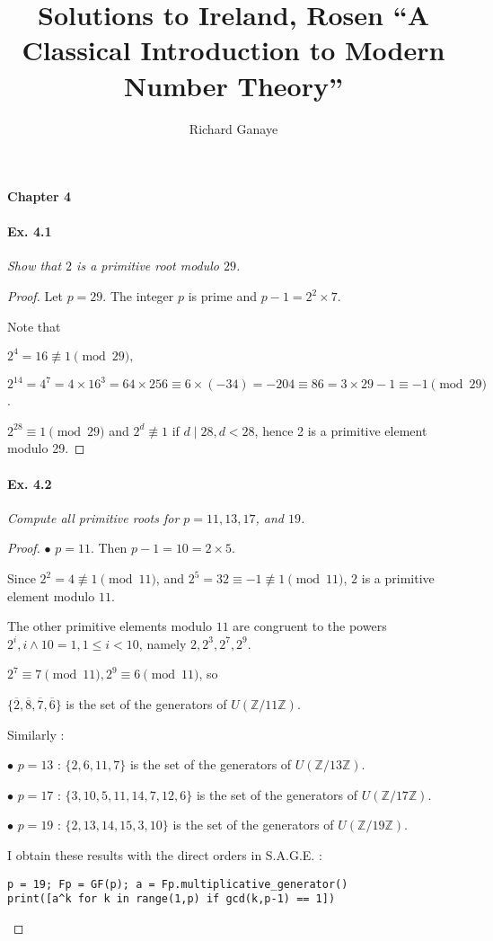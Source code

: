 \documentclass[11pt,a4paper]{article}
\title{Solutions to Ireland, Rosen ``A Classical Introduction to Modern Number Theory''}
\author{Richard Ganaye}
\newcommand{\Z}{\mathbb{Z}}
\begin{document}
\maketitle

{\large \bf Chapter 4}

\paragraph{Ex. 4.1}

{\it Show that $2$ is a primitive root modulo $29$.
}

\begin{proof}
Let $p=29$. The integer $p$ is prime and $p-1 = 2^2\times 7$.

Note that

$2^4 = 16 \not \equiv1\pmod {29},$

$2^{14} =  4 ^7 =4 \times 16^3 = 64\times 256 \equiv 6 \times (-34)=-204\equiv 86=3\times 29 -1 \equiv -1\pmod{29}$.

$2^{28} \equiv 1\pmod {29}$ and $2^d \not \equiv 1$ if $d \mid 28, d < 28$, hence 2 is a primitive element modulo 29.
\end{proof}

\paragraph{Ex. 4.2}

{\it Compute all primitive roots for $p = 11, 13, 17$, and $19$.
}

\begin{proof}
$\bullet$ $p=11$. Then $p-1 = 10 = 2\times 5$.

Since $2^2 = 4 \not \equiv 1 \pmod {11}$, and $2^5 = 32 \equiv -1 \not \equiv 1 \pmod{11}$, $2$ is a primitive element modulo $11$.

The other primitive elements modulo $11$ are congruent to the powers $2^i, i\wedge 10 = 1, 1\leq i <10$, namely $2,2^3,2^7,2^9$.

$2^7 \equiv 7 \pmod {11},2^9 \equiv 6 \pmod {11}$, so

$ \{\overline{2}, \overline{8}, \overline{7}, \overline{6}\}$ is the set of the generators of $U(\Z/11\Z)$.

Similarly :

$\bullet$ $p=13$ : $\{2,6,11,7\}$ is the set of the generators of $U(\Z/13\Z)$.

$\bullet$ $p=17$ : $\{3, 10, 5, 11, 14, 7, 12, 6\}$ is the set of the generators of $U(\Z/17\Z)$.

$\bullet$ $p=19$ : $\{2, 13, 14, 15, 3, 10\}$ is the set of the generators of $U(\Z/19\Z)$.

I obtain these results with the direct orders in S.A.G.E. :
\begin{verbatim}
p = 19; Fp = GF(p); a = Fp.multiplicative_generator()
print([a^k for k in range(1,p) if gcd(k,p-1) == 1])
\end{verbatim}
\end{proof}
\end{document}

